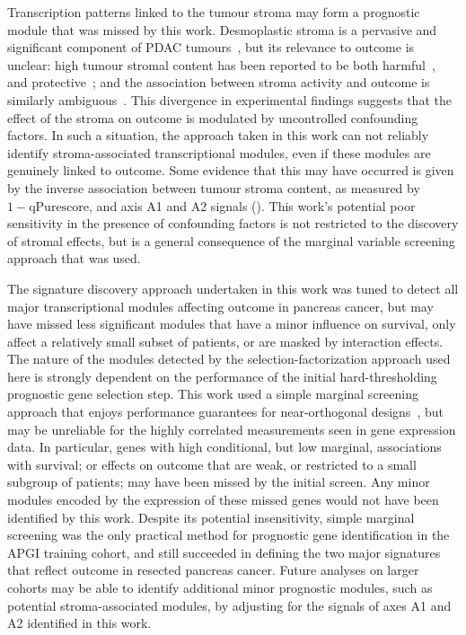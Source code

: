 \documentclass[dissertation.tex]{subfiles}
\begin{document}
Transcription patterns linked to the tumour stroma may form a prognostic module that was missed by this work.  Desmoplastic stroma is a pervasive and significant component of \gls{PDAC} tumours~\cite{Hidalgo2010}, but its relevance to outcome is unclear: high tumour stromal content has been reported to be both harmful~\cite{Luo2012, Provenzano2012}, and protective~\cite{Rhim2014, Sinn2014}; and the association between stroma activity and outcome is similarly ambiguous~\cite{Bever2014, Sinn2014}.  This divergence in experimental findings suggests that the effect of the stroma on outcome is modulated by uncontrolled confounding factors.  In such a situation, the approach taken in this work can not reliably identify stroma-associated transcriptional modules, even if these modules are genuinely linked to outcome.  Some evidence that this may have occurred is given by the inverse association between tumour stroma content, as measured by $1 - \mathrm{qPure score}$, and axis A1 and A2 signals ().  This work's potential poor sensitivity in the presence of confounding factors is not restricted to the discovery of stromal effects, but is a general consequence of the marginal variable screening approach that was used.

The signature discovery approach undertaken in this work was tuned to detect all major transcriptional modules affecting outcome in pancreas cancer, but may have missed less significant modules that have a minor influence on survival, only affect a relatively small subset of patients, or are masked by interaction effects.  The nature of the modules detected by the selection-factorization approach used here is strongly dependent on the performance of the initial hard-thresholding prognostic gene selection step.  This work used a simple marginal screening approach that enjoys performance guarantees for near-orthogonal designs~\cite{Fan2008}, but may be unreliable for the highly correlated measurements seen in gene expression data.  In particular, genes with high conditional, but low marginal, associations with survival; or effects on outcome that are weak, or restricted to a small subgroup of patients; may have been missed by the initial screen.  Any minor modules encoded by the expression of these missed genes would not have been identified by this work.  Despite its potential insensitivity, simple marginal screening was the only practical method for prognostic gene identification in the \gls{APGI} training cohort, and still succeeded in defining the two major signatures that reflect outcome in resected pancreas cancer.  Future analyses on larger cohorts may be able to identify additional minor prognostic modules, such as potential stroma-associated modules, by adjusting for the signals of axes A1 and A2 identified in this work.
\end{document}

